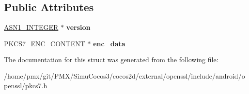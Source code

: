 \subsection*{Public Attributes}
\begin{DoxyCompactItemize}
\item 
\mbox{\label{structpkcs7__signedandenveloped__st_a7604cc12476982f933df75c3a729b6ba}} 
\hyperlink{structasn1__string__st}{A\+S\+N1\+\_\+\+I\+N\+T\+E\+G\+ER} $\ast$ {\bfseries version}
\item 
\mbox{\label{structpkcs7__signedandenveloped__st_a6fa2d51e34d1b30fb784de3107529bc0}} 
\hyperlink{structpkcs7__enc__content__st}{P\+K\+C\+S7\+\_\+\+E\+N\+C\+\_\+\+C\+O\+N\+T\+E\+NT} $\ast$ {\bfseries enc\+\_\+data}
\end{DoxyCompactItemize}


The documentation for this struct was generated from the following file\+:\begin{DoxyCompactItemize}
\item 
/home/pmx/git/\+P\+M\+X/\+Simu\+Cocos3/cocos2d/external/openssl/include/android/openssl/pkcs7.\+h\end{DoxyCompactItemize}
